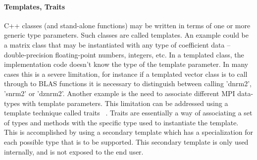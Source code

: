 \documentclass[12pt,relax]{TrilinosOverview}
\begin{document}
\paragraph{Templates, Traits}
C++ classes (and stand-alone functions) may be written in terms of one or more
generic type parameters. Such classes are called templates. An example could be
a matrix class that may be instantiated with any type of coefficient data --
double-precision floating-point numbers, integers, etc. In a templated class,
the implementation code doesn't know the type of the template parameter. In
many cases this is a severe limitation, for instance if a templated vector
class is to call through to BLAS functions it is necessary to distinguish
between calling 'dnrm2', 'snrm2' or 'dznrm2'. Another example is the need to
associate different MPI data-types with template parameters. This limitation
can be addressed using a template technique called traits ~\cite{MyersTraits}.
Traits are essentially a way of associating a set of types and methods with
the specific type used to instantiate the template. This is accomplished by
using a secondary template which has a specialization for each possible type
that is to be supported. This secondary template is only used internally, and
is not exposed to the end user.
\end{document}
